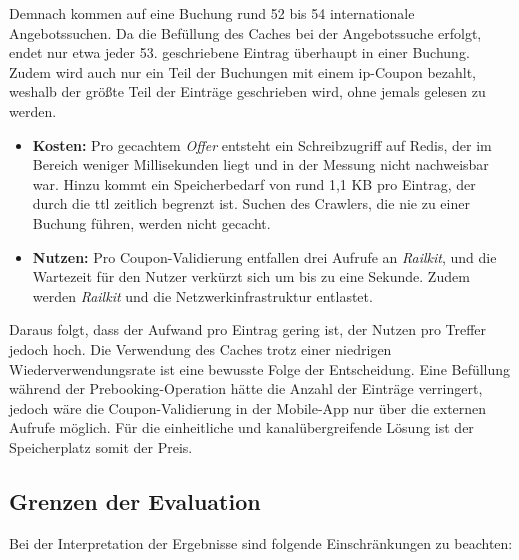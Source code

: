 Demnach kommen auf eine Buchung rund 52 bis 54 internationale Angebotssuchen. Da die Befüllung des Caches bei der Angebotssuche erfolgt, endet nur etwa jeder 53. geschriebene Eintrag überhaupt in einer Buchung. Zudem wird auch nur ein Teil der Buchungen mit einem \ac{ip}-Coupon bezahlt, weshalb der größte Teil der Einträge geschrieben wird, ohne jemals gelesen zu werden. %

\begin{itemize}
    \item \textbf{Kosten:} Pro gecachtem \textit{Offer} entsteht ein Schreibzugriff auf Redis, der im Bereich weniger Millisekunden liegt und in der Messung nicht nachweisbar war. Hinzu kommt ein Speicherbedarf von rund 1,1 KB pro Eintrag, der durch die \ac{ttl} zeitlich begrenzt ist. Suchen des Crawlers, die nie zu einer Buchung führen, werden nicht gecacht.
    \item \textbf{Nutzen:} Pro Coupon-Validierung entfallen drei Aufrufe an \textit{Railkit}, und die Wartezeit für den Nutzer verkürzt sich um bis zu eine Sekunde. Zudem werden \textit{Railkit} und die Netzwerkinfrastruktur entlastet.
\end{itemize}

Daraus folgt, dass der Aufwand pro Eintrag gering ist, der Nutzen pro Treffer jedoch hoch. Die Verwendung des Caches trotz einer niedrigen Wiederverwendungsrate ist eine bewusste Folge der Entscheidung. Eine Befüllung während der Prebooking-Operation hätte die Anzahl der Einträge verringert, jedoch wäre die Coupon-Validierung in der Mobile-App nur über die externen Aufrufe möglich. Für die einheitliche und kanalübergreifende Lösung ist der Speicherplatz somit der Preis.

\subsection{Grenzen der Evaluation}
\label{subsec:grenzen_evaluation}

Bei der Interpretation der Ergebnisse sind folgende Einschränkungen zu beachten:

